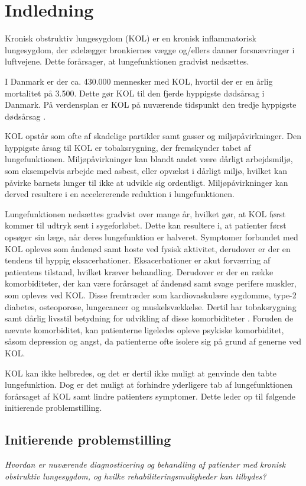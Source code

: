 \chapter{Indledning} 
Kronisk obstruktiv lungesygdom (KOL) er en kronisk inflammatorisk lungesygdom, der ødelægger bronkiernes vægge og/ellers danner forsnævringer i luftvejene. Dette forårsager, at lungefunktionen gradvist nedsættes.\cite{Basisbogen2016}

I Danmark er der ca. 430.000 mennesker med KOL, hvortil der er en årlig mortalitet på 3.500. Dette gør KOL til den fjerde hyppigste dødsårsag i Danmark.\cite{Basisbogen2016} På verdensplan er KOL på nuværende tidspunkt den tredje hyppigste dødsårsag \cite{WHO2017}.

KOL opstår som ofte af skadelige partikler samt gasser og miljøpåvirkninger. Den hyppigste årsag til KOL er tobaksrygning, der fremskynder tabet af lungefunktionen.\cite{dsam2016,Basisbogen2016,Martinez2016} Miljøpåvirkninger kan blandt andet være dårligt arbejdsmiljø, som eksempelvis arbejde med asbest, eller opvækst i dårligt miljø, hvilket kan påvirke barnets lunger til ikke at udvikle sig ordentligt. Miljøpåvirkninger kan derved resultere i en accelererende reduktion i lungefunktionen.\cite{Martinez2016}

Lungefunktionen nedsættes gradvist over mange år, hvilket gør, at KOL først kommer til udtryk sent i sygeforløbet. Dette kan resultere i, at patienter først opsøger sin læge, når deres lungefunktion er halveret.\cite{dsam2016} Symptomer forbundet med KOL opleves som åndenød samt hoste ved fysisk aktivitet, derudover er der en tendens til hyppig eksacerbationer. Eksacerbationer er akut forværring af patientens tilstand, hvilket kræver behandling.\cite{dsam2016,Basisbogen2016}
Derudover er der en række komorbiditeter, der kan være forårsaget af åndenød samt svage perifere muskler, som opleves ved KOL. Disse fremtræder som kardiovaskulære sygdomme, type-2 diabetes, osteoporose, lungecancer og muskelsvækkelse.\cite{dsam2016} Dertil har tobaksrygning samt dårlig livsstil betydning for udvikling af disse komorbiditeter \cite{McCarthy2015}. Foruden de nævnte komorbiditet, kan patienterne ligeledes opleve psykiske komorbiditet, såsom depression og angst, da patienterne ofte isolere sig på grund af generne ved KOL.\cite{dsam2016}

KOL kan ikke helbredes, og det er dertil ikke muligt at genvinde den tabte lungefunktion. Dog er det muligt at forhindre yderligere tab af lungefunktionen forårsaget af KOL samt lindre patienters symptomer.\cite{Basisbogen2016} Dette leder op til følgende initierende problemstilling.


\section{Initierende problemstilling}
\textit{Hvordan er nuværende diagnosticering og behandling af patienter med kronisk obstruktiv lungesygdom, og hvilke rehabiliteringsmuligheder kan tilbydes?}